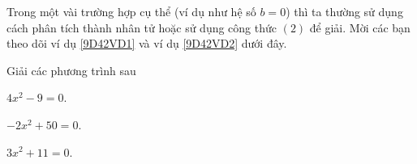   Trong một vài trường hợp cụ thể (ví dụ như hệ số $b=0$) thì ta thường sử dụng cách phân tích thành nhân tử hoặc sử dụng công thức $(2)$ để giải. Mời các bạn theo dõi ví dụ \ref{9D42VD1} và ví dụ \ref{9D42VD2} dưới đây.
\begin{vd}\label{9D42VD1}
	Giải các phương trình sau
	\begin{enumEX}{3}
		\item $4x^2-9=0$.
		\item $-2x^2+50=0$.
		\item $3x^2+11=0$.
	\end{enumEX}
\end{vd}

